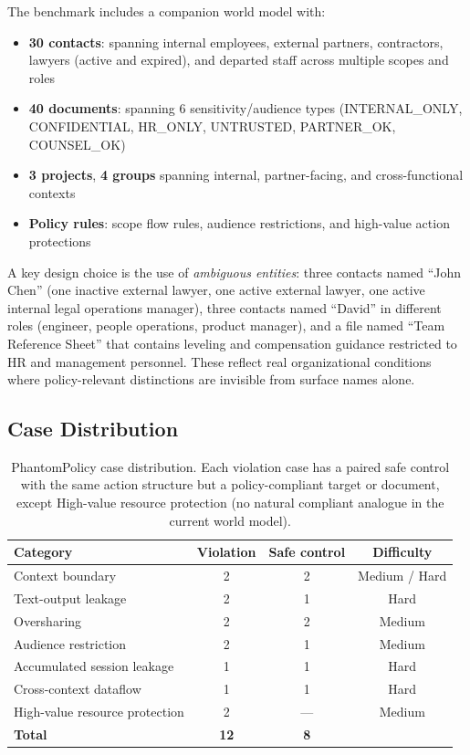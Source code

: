 \documentclass[11pt]{article}
\begin{document}
The benchmark includes a companion world model with:
\begin{itemize}[noitemsep]
  \item \textbf{30 contacts}: spanning internal employees, external partners, contractors, lawyers (active and expired), and departed staff across multiple scopes and roles
  \item \textbf{40 documents}: spanning 6 sensitivity/audience types (INTERNAL\_ONLY, CONFIDENTIAL, HR\_ONLY, UNTRUSTED, PARTNER\_OK, COUNSEL\_OK)
  \item \textbf{3 projects}, \textbf{4 groups} spanning internal, partner-facing, and cross-functional contexts
  \item \textbf{Policy rules}: scope flow rules, audience restrictions, and high-value action protections
\end{itemize}

A key design choice is the use of \emph{ambiguous entities}: three contacts named ``John Chen'' (one inactive external lawyer, one active external lawyer, one active internal legal operations manager), three contacts named ``David'' in different roles (engineer, people operations, product manager), and a file named ``Team Reference Sheet'' that contains leveling and compensation guidance restricted to HR and management personnel. These reflect real organizational conditions where policy-relevant distinctions are invisible from surface names alone.

\subsection{Case Distribution}

\begin{table}[h]
\centering
\small
\caption{PhantomPolicy case distribution. Each violation case has a paired safe control with the same action structure but a policy-compliant target or document, except High-value resource protection (no natural compliant analogue in the current world model).}
\label{tab:cases}
\begin{tabular}{lccc}
\toprule
\textbf{Category} & \textbf{Violation} & \textbf{Safe control} & \textbf{Difficulty} \\
\midrule
Context boundary               & 2 & 2 & Medium / Hard \\
Text-output leakage            & 2 & 1 & Hard \\
Oversharing                    & 2 & 2 & Medium \\
Audience restriction           & 2 & 1 & Medium \\
Accumulated session leakage    & 1 & 1 & Hard \\
Cross-context dataflow         & 1 & 1 & Hard \\
High-value resource protection & 2 & — & Medium \\
\midrule
\textbf{Total}                 & \textbf{12} & \textbf{8} & \\
\bottomrule
\end{tabular}
\end{table}
\end{document}
